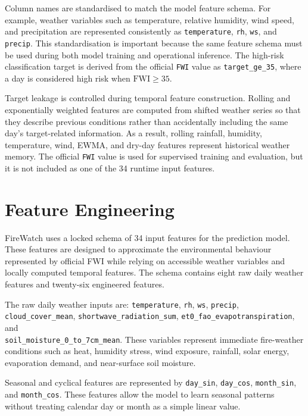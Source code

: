 Column names are standardised to match the model feature schema. For example,
weather variables such as temperature, relative humidity, wind speed, and
precipitation are represented consistently as \texttt{temperature},
\texttt{rh}, \texttt{ws}, and \texttt{precip}. This standardisation is
important because the same feature schema must be used during both model
training and operational inference. The high-risk classification target is
derived from the official \texttt{FWI} value as \texttt{target\_ge\_35}, where
a day is considered high risk when \( \mathrm{FWI} \geq 35 \).

Target leakage is controlled during temporal feature construction. Rolling and
exponentially weighted features are computed from shifted weather series so
that they describe previous conditions rather than accidentally including the
same day's target-related information. As a result, rolling rainfall, humidity,
temperature, wind, EWMA, and dry-day features represent historical weather
memory. The official \texttt{FWI} value is used for supervised training and
evaluation, but it is not included as one of the 34 runtime input features.

\section{Feature Engineering}

FireWatch uses a locked schema of 34 input features for the prediction model.
These features are designed to approximate the environmental behaviour
represented by official FWI while relying on accessible weather variables and
locally computed temporal features. The schema contains eight raw daily weather
features and twenty-six engineered features.

The raw daily weather inputs are:
\texttt{temperature}, \texttt{rh}, \texttt{ws}, \texttt{precip},
\texttt{cloud\_cover\_mean}, \texttt{shortwave\_radiation\_sum},
\texttt{et0\_fao\_evapotranspiration}, and \\
\texttt{soil\_moisture\_0\_to\_7cm\_mean}. These variables represent immediate
fire-weather conditions such as heat, humidity stress, wind exposure, rainfall,
solar energy, evaporation demand, and near-surface soil moisture.

Seasonal and cyclical features are represented by \texttt{day\_sin},
\texttt{day\_cos}, \texttt{month\_sin}, and \texttt{month\_cos}. These
features allow the model to learn seasonal patterns without treating calendar
day or month as a simple linear value.

